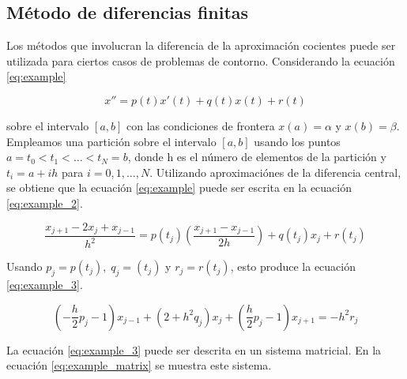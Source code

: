 \subsection{Método de diferencias finitas}

Los métodos que involucran la diferencia de la aproximación cocientes puede ser utilizada para ciertos casos de problemas de contorno. Considerando la ecuación \ref{eq:example}

\begin{equation}
    x'' = p(t)x'(t)+q(t)x(t)+r(t) \label{eq:example}
\end{equation}

sobre el intervalo $[a,b]$ con las condiciones de frontera $x(a)=\alpha$ y $x(b)=\beta$. Empleamos una partición sobre el intervalo $[a,b]$ usando los puntos $a=t_0 < t_1 < \dots < t_N=b$, donde h es el número de elementos de la partición y $t_i = a+ih$ para $i=0,1,\dots ,N$. Utilizando aproximaciónes de la diferencia central, se obtiene que la ecuación \ref{eq:example} puede ser escrita en la ecuación \ref{eq:example_2}.

\begin{equation}
    \frac{x_{j+1}-2x_j +x_{j-1}}{h^2} = p(t_j) \left (\frac{x_{j+1}-x_{j-1}}{2h}\right ) + q(t_j)x_j + r(t_j) \label{eq:example_2}
\end{equation}

Usando $p_j=p(t_j),\; q_j=(t_j)$ y $r_j=r(t_j)$, esto produce la ecuación \ref{eq:example_3}.

\begin{equation}
    \left (-\frac{h}{2}p_j -1\right ) x_{j-1} + (2+h^2q_j)x_j + \left (\frac{h}{2}p_j-1\right ) x_{j+1} = -h^2r_j \label{eq:example_3}
\end{equation}

La ecuación \ref{eq:example_3} puede ser descrita en un sistema matricial. En la ecuación \ref{eq:example_matrix} se muestra este sistema.

